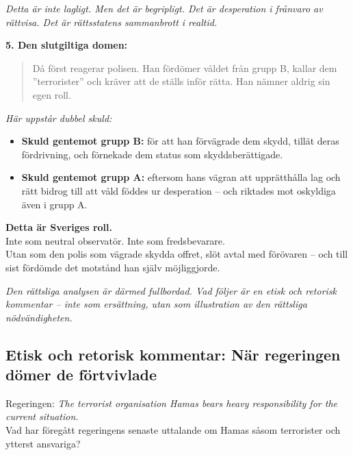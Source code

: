 \textit{Detta är inte lagligt. Men det är begripligt. Det är desperation i frånvaro av rättvisa. Det är rättsstatens sammanbrott i realtid.}

\textbf{5. Den slutgiltiga domen:}
\begin{quote}
Då först reagerar polisen. Han fördömer våldet från grupp B, kallar dem ”terrorister” och kräver att de ställs inför rätta. Han nämner aldrig sin egen roll.
\end{quote}

\textit{Här uppstår dubbel skuld:}
\begin{itemize}
    \item \textbf{Skuld gentemot grupp B:} för att han förvägrade dem skydd, tillät deras fördrivning, och förnekade dem status som skyddsberättigade.

    \item \textbf{Skuld gentemot grupp A:} eftersom hans vägran att upprätthålla lag och rätt bidrog till att våld föddes ur desperation – och riktades mot oskyldiga även i grupp A.
\end{itemize}

\textbf{Detta är Sveriges roll.}\\
Inte som neutral observatör. Inte som fredsbevarare.\\
Utan som den polis som vägrade skydda offret, slöt avtal med förövaren – och till sist fördömde det motstånd han själv möjliggjorde.

\vspace{1em}
\noindent\textit{Den rättsliga analysen är därmed fullbordad. Vad följer är en etisk och retorisk kommentar – inte som ersättning, utan som illustration av den rättsliga nödvändigheten.}



\subsection*{Etisk och retorisk kommentar: När regeringen dömer de förtvivlade}
Regeringen: \textit{The terrorist organisation Hamas bears heavy responsibility for the current situation. }\\
Vad har föregått regeringens senaste uttalande om Hamas såsom terrorister och ytterst ansvariga?

